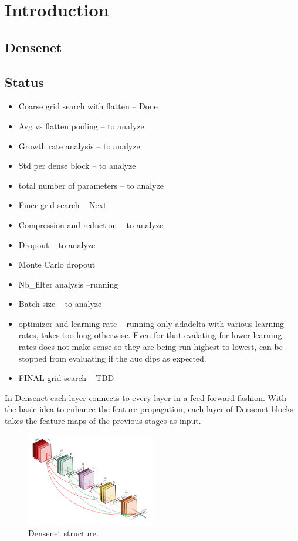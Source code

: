 
\chapter{Introduction}

\section{Densenet}

\section{Status}
\begin{itemize}
 \item Coarse grid search with flatten -- Done
 \item Avg vs flatten pooling -- to analyze
 \item Growth rate analysis -- to analyze
 \item Std per dense block -- to analyze
 \item total number of parameters -- to analyze
 \item Finer grid search -- Next
 \item Compression and reduction -- to analyze
 \item Dropout -- to analyze
 \item Monte Carlo dropout
 \item Nb\_filter analysis --running
 \item Batch size -- to analyze
 \item optimizer and learning rate -- running only adadelta with various learning rates, takes too long otherwise. Even for that evalating for lower learning rates does not make sense so they are being run highest to lowest, 
 can be stopped from evaluating if the auc dips as expected.
 \item FINAL grid search -- TBD
\end{itemize}


In Densenet each layer connects to every layer in a feed-forward fashion. 
With the basic idea to enhance the feature propagation, each layer of Densenet blocks takes the feature-maps of the previous stages as input.  
\begin{figure}[h]
\centering
\includegraphics[width=0.5\textwidth]{images/densenet/densenet.png}
\caption{\label{fig:densenet}Densenet structure.}
\end{figure}
\flushbottom
\newpage

